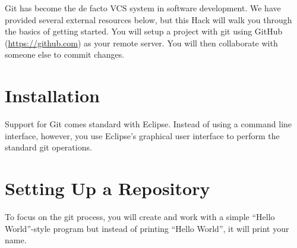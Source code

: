 \documentclass[12pt]{scrartcl}
\begin{document}
Git has become the de facto VCS system in software development.  We have
provided several external resources below, but this Hack will walk you
through the basics of getting started.  You will setup a project with 
git using GitHub (\url{https://github.com}) as your remote server.  You
will then collaborate with someone else to commit changes.

\section{Installation}

Support for Git comes standard with Eclipse.  Instead of using
a command line interface, however, you use Eclipse's graphical 
user interface to perform the standard git operations.

\section{Setting Up a Repository}

To focus on the git process, you will create and work with a simple
``Hello World''-style program but instead of printing ``Hello World'', 
it will print your name. 
\end{document}
